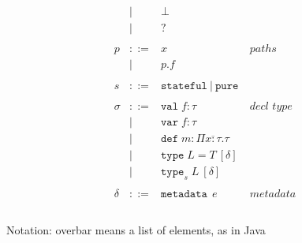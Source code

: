 \documentclass{article}
\newcommand{\keywadj}[1]{\mathtt{#1}}
\newcommand{\keyw}[1]{\keywadj{#1}~}
\begin{document}
\[\begin{array}{lll}
\begin{array}{lllr}
     & |   & \bot                                                  &\\
     & |   & ?                                                     &\\
&&\\
p & ::= & x   & paths \\
  & |   & p.f &\\
&&\\
s & ::= & \keyw{stateful} | ~\keyw{pure} \\
&&\\
\sigma & ::= & \texttt{val} \; f:\tau                           & \textit{decl type}\\
       & |   & \texttt{var} \; f:\tau                           &\\
       & |   & \texttt{def} \; m:\Pi \overline{x{:}\tau} . \tau &\\
       & |   & \texttt{type} \; L = T ~[\delta]                 &\\
       & |   & \texttt{type}_{s} \; L ~[\delta]                 &\\
&&\\
\delta & ::= & \keyw{metadata} ~e & metadata \\
&&\\
\end{array}
\end{array}
\]

Notation: overbar means a list of elements, as in Java
\end{document}
